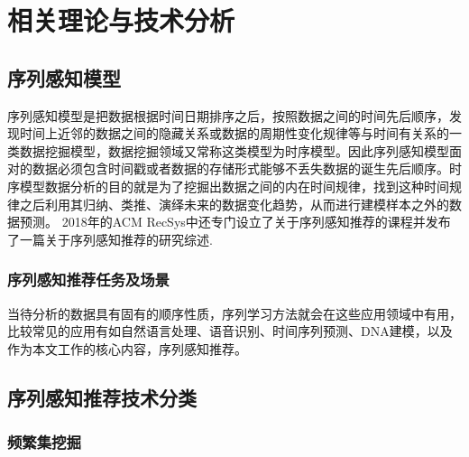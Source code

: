 \chapter{相关理论与技术分析}










\section{序列感知模型}
序列感知模型是把数据根据时间日期排序之后，按照数据之间的时间先后顺序，发现时间上近邻的数据之间的隐藏关系或数据的周期性变化规律等与时间有关系的一类数据挖掘模型，数据挖掘领域又常称这类模型为时序模型。因此序列感知模型面对的数据必须包含时间戳或者数据的存储形式能够不丢失数据的诞生先后顺序。时序模型数据分析的目的就是为了挖掘出数据之间的内在时间规律，找到这种时间规律之后利用其归纳、类推、演绎未来的数据变化趋势，从而进行建模样本之外的数据预测。
2018年的ACM RecSys中还专门设立了关于序列感知推荐的课程并发布了一篇关于序列感知推荐的研究综述.



\subsection{序列感知推荐任务及场景}

当待分析的数据具有固有的顺序性质，序列学习方法就会在这些应用领域中有用，比较常见的应用有如自然语言处理、语音识别、时间序列预测、DNA建模，以及作为本文工作的核心内容，序列感知推荐。


\section{序列感知推荐技术分类}

\subsection{频繁集挖掘}

